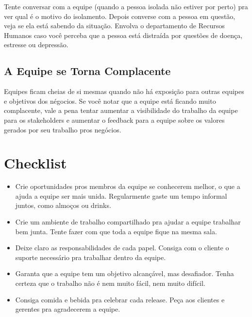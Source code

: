 \documentclass[a4paper, 10pt, font=plain]{abnt}
\begin{document}
Tente conversar com a equipe (quando a pessoa isolada não estiver por perto) pra ver qual é o motivo do isolamento. Depois converse com a pessoa em questão, veja se ela está sabendo da situação. Envolva o departamento de Recursos Humanos caso você perceba que a pessoa está distraída por questões de doença, estresse ou depressão.

\subsection{A Equipe se Torna Complacente}
Equipes ficam cheias de si mesmas quando não há exposição para outras equipes e objetivos dos négocios. Se você notar que a equipe está ficando muito complacente, vale a pena tentar aumentar a visibilidade do trabalho da equipe para os stakeholders e aumentar o feedback para a equipe sobre os valores gerados por seu trabalho pros negócios.



\section{Checklist}

\begin{itemize}
\item Crie oportunidades pros membros da equipe se conhecerem melhor, o que a ajuda a equipe ser mais unida. Regularmente gaste um tempo informal juntos, como almoços ou drinks.

\item Crie um ambiente de trabalho compartilhado pra ajudar a equipe trabalhar bem junta. Tente fazer com que toda a equipe fique na mesma sala.

\item Deixe claro as responsabilidades de cada papel. Consiga com o cliente o suporte necessário pra trabalhar dentro da equipe.

\item Garanta que a equipe tem um objetivo alcançável, mas desafiador. Tenha certeza que o trabalho não é nem muito fácil, nem muito difícil.

\item Consiga comida e bebida pra celebrar cada release. Peça aos clientes e gerentes pra agradecerem a equipe.

\end{itemize}
\end{document}
